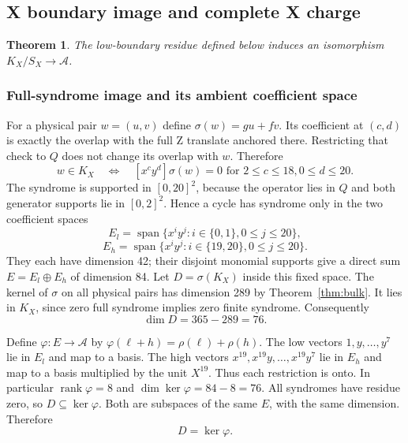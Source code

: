 \documentclass{article}
\newtheorem{theorem}{Theorem}
\DeclareMathOperator{\rank}{rank}
\DeclareMathOperator{\Span}{span}
\begin{document}
\subsection{X boundary image and complete X charge}\label{app:x-charge}

\begin{theorem}\label{thm:x-charge}
  The low-boundary residue defined below induces an isomorphism
  \(K_X/S_X \to \mathcal{A}\).
\end{theorem}

\subsubsection{Full-syndrome image and its ambient coefficient space}\label{app:x-image}

For a physical pair \(w = (u,v)\) define
\(\sigma(w) = gu + fv\). Its coefficient at \((c,d)\) is exactly the overlap
with the full Z translate anchored there. Restricting that check to \(Q\)
does not change its overlap with \(w\). Therefore
\begin{equation}
  w \in K_X \quad \Longleftrightarrow \quad
  [x^c y^d] \sigma(w) = 0
  \text{ for } 2 \le c \le 18, 0 \le d \le 20.
\end{equation}
The syndrome is supported in \([0,20]^2\), because the operator lies in
\(Q\) and both generator supports lie in \([0,2]^2\).
Hence a cycle has syndrome only in the two coefficient spaces
\begin{equation}
  E_l = \Span\{x^i y^j : i \in \{0,1\}, 0 \le j \le 20\},
\end{equation}
\begin{equation}
  E_h = \Span\{x^i y^j : i \in \{19,20\}, 0 \le j \le 20\}.
\end{equation}
They each have dimension 42; their disjoint monomial supports give a
direct sum \(E = E_l \oplus E_h\) of dimension 84.
Let \(D = \sigma(K_X)\) inside this fixed space.
The kernel of \(\sigma\) on all physical pairs has dimension 289 by
Theorem~\ref{thm:bulk}. It lies in \(K_X\), since zero full syndrome implies
zero finite syndrome. Consequently
\begin{equation}
  \dim D = 365 - 289 = 76.
\end{equation}

Define \(\varphi \colon E \to \mathcal{A}\) by \(\varphi(\ell + h) = \rho(\ell) + \rho(h)\).
The low vectors \(1, y, \dots, y^7\) lie in \(E_l\) and map to a basis.
The high vectors \(x^{19}, x^{19} y, \dots, x^{19} y^7\) lie in \(E_h\) and
map to a basis multiplied by the unit \(X^{19}\). Thus each restriction
is onto. In particular \(\rank \varphi = 8\) and \(\dim \ker \varphi = 84 - 8 = 76\).
All syndromes have residue zero, so \(D \subseteq \ker \varphi\).
Both are subspaces of the same \(E\), with the same dimension. Therefore
\begin{equation}
  D = \ker \varphi.
\end{equation}
\end{document}
